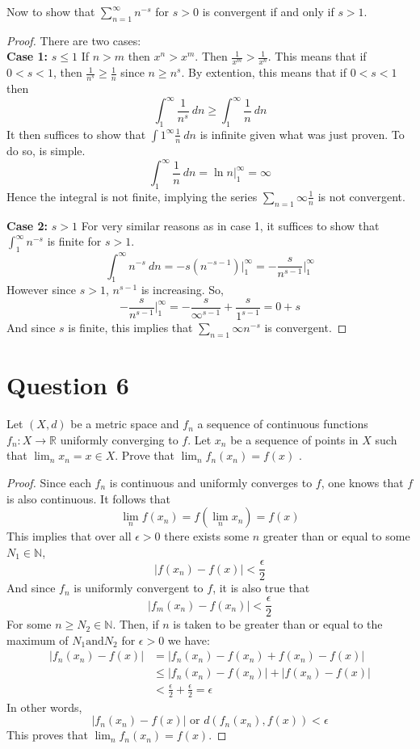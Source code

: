 \documentclass[12pt, letterpaper]{article}
\begin{document}
Now to show that $\sum_{n=1}^{\infty} n^{-s}$ for $s>0$ is convergent if and only if $s>1$.
\begin{proof}
  There are two cases:\\

  \noindent\textbf{Case 1:} $s \leq 1$
  If $n > m$ then $x^n > x^m$. Then $\frac{1}{x^m} > \frac{1}{x^n}$. This means that if $0< s < 1$, then $\frac{1}{n^s} \geq \frac{1}{n}$ since $n \geq n^s$. By extention, this means that if $0< s < 1$ then
  $$ \int_{1}^{\infty} \frac{1}{n^s} ~dn \geq \int_{1}^{\infty} \frac{1}{n} ~dn$$
  It then suffices to show that $\int{1}^{\infty}\frac{1}{n} ~dn$ is infinite given what was just proven. To do so, is simple.
  $$\int_{1}^{\infty}\frac{1}{n} ~dn = \ln{n}\bigg\rvert_{1}^{\infty} = \infty$$
  Hence the integral is not finite, implying the series $\sum_{n=1}{\infty}\frac{1}{n}$ is not convergent.

  \noindent\textbf{Case 2:} $s > 1$
  For very similar reasons as in case 1, it suffices to show that $\int_{1}^{\infty}n^{-s}$ is finite for $s>1$.
  $$\int_{1}^{\infty} n^{-s} ~dn = -s(n^{-s -1})\bigg\rvert_{1}^{\infty} = -\frac{s}{n^{s - 1}}\bigg\rvert_{1}^{\infty}$$
  However since $s > 1$, $n^{s - 1}$ is increasing. So,
  $$-\frac{s}{n^{s - 1}}\bigg\rvert_{1}^{\infty} = -\frac{s}{\infty^{s-1}} + \frac{s}{1^{s-1}} = 0 + s$$
  And since $s$ is finite, this implies that $\sum_{n=1}{\infty}n^{-s}$ is convergent.
\end{proof}
\section*{Question 6}
Let $(X,d)$ be a metric space and $f_n$ a sequence of continuous functions  $f_n : X \rightarrow \mathbb R$ uniformly converging to $f$. Let $x_n$ be a
sequence of points in $X$ such that $\lim_n x_n=x\in X$. Prove that $\lim_n f_n(x_n)=f(x)$ .

\begin{proof}
  Since each $f_n$ is continuous and uniformly converges to $f$, one knows that $f$ is also continuous. It follows that
  $$ \lim_n f(x_n)  = f(\lim_n x_n) = f(x)$$
  This implies that over all $\epsilon > 0$ there exists some $n$ greater than or equal to some $N_1 \in \mathbb{N}$,
  $$ |f(x_n) - f(x)| < \frac{\epsilon}{2} $$
  And since $f_n$ is uniformly convergent to $f$, it is also true that
  $$ |f_m(x_n) - f(x_n)| < \frac{\epsilon}{2} $$
  For some $n \geq N_2 \in \mathbb{N}$. Then, if $n$ is taken to be greater than or equal to the maximum of $N_1 \text{and} N_2$ for $\epsilon > 0$ we have:
  \begin{align*}
    |f_n(x_n) - f(x)| &= |f_n(x_n) - f(x_n) + f(x_n) - f(x)| \\
    & \leq |f_n(x_n) - f(x_n)| + |f(x_n) - f(x)| \\
    &< \frac{\epsilon}{2} + \frac{\epsilon}{2} = \epsilon
  \end{align*}
  In other words,
  $$|f_n(x_n) - f(x)| \text{ or } d(f_n(x_n), f(x)) < \epsilon$$
  \noindent This proves that $\lim_n f_n(x_n)=f(x)$.

\end{proof}
\end{document}
